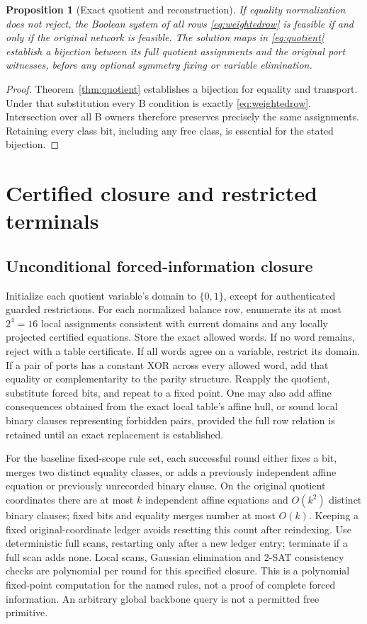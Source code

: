 \documentclass[11pt,letterpaper]{article}
\newtheorem{proposition}[theorem]{Proposition}
\theoremstyle{definition}
\newcommand{\bits}{\{0,1\}}
\begin{document}
\begin{proposition}[Exact quotient and reconstruction]\label{prop:exact}
If equality normalization does not reject, the Boolean system of all rows \eqref{eq:weightedrow} is feasible if and only if the original network is feasible. The solution maps in \eqref{eq:quotient} establish a bijection between its full quotient assignments and the original port witnesses, before any optional symmetry fixing or variable elimination.
\end{proposition}
\begin{proof}
Theorem~\ref{thm:quotient} establishes a bijection for equality and transport. Under that substitution every B condition is exactly \eqref{eq:weightedrow}. Intersection over all B owners therefore preserves precisely the same assignments. Retaining every class bit, including any free class, is essential for the stated bijection.
\end{proof}

\section{Certified closure and restricted terminals}\label{sec:closure}
\subsection{Unconditional forced-information closure}
Initialize each quotient variable's domain to \(\bits\), except for authenticated guarded restrictions. For each normalized balance row, enumerate its at most \(2^4=16\) local assignments consistent with current domains and any locally projected certified equations. Store the exact allowed words. If no word remains, reject with a table certificate. If all words agree on a variable, restrict its domain. If a pair of ports has a constant XOR across every allowed word, add that equality or complementarity to the parity structure. Reapply the quotient, substitute forced bits, and repeat to a fixed point. One may also add affine consequences obtained from the exact local table's affine hull, or sound local binary clauses representing forbidden pairs, provided the full row relation is retained until an exact replacement is established.

For the baseline fixed-scope rule set, each successful round either fixes a bit, merges two distinct equality classes, or adds a previously independent affine equation or previously unrecorded binary clause. On the original quotient coordinates there are at most \(k\) independent affine equations and \(O(k^2)\) distinct binary clauses; fixed bits and equality merges number at most \(O(k)\). Keeping a fixed original-coordinate ledger avoids resetting this count after reindexing. Use deterministic full scans, restarting only after a new ledger entry; terminate if a full scan adds none. Local scans, Gaussian elimination and 2-SAT consistency checks are polynomial per round for this specified closure. This is a polynomial fixed-point computation for the named rules, not a proof of complete forced information. An arbitrary global backbone query is not a permitted free primitive.
\end{document}
